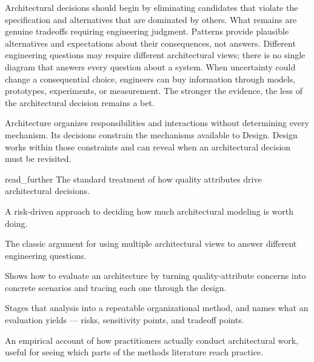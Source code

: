 Architectural decisions should begin by eliminating candidates that violate the specification and
alternatives that are dominated by others. What remains are genuine tradeoffs requiring
engineering judgment. Patterns provide plausible alternatives and expectations about their
consequences, not answers. Different engineering questions may require different architectural
views; there is no single diagram that answers every question about a system. When uncertainty
could change a consequential choice, engineers can buy information through models, prototypes,
experiments, or measurement. The stronger the evidence, the less of the architectural decision
remains a bet.

Architecture organizes responsibilities and interactions without determining every mechanism.
Its decisions constrain the mechanisms available to Design.
Design works within those constraints and can reveal when an architectural decision must be revisited.

\begin{bookbox}{read_further}{} %
\citep{bass-saip} The standard treatment of how quality attributes drive architectural decisions.

\citep{fairbanks2010} A risk-driven approach to deciding how much architectural modeling is worth doing.

\citep{kruchten1995} The classic argument for using multiple architectural views to answer different engineering questions.

\citep{abowd1996scenario} Shows how to evaluate an architecture by turning quality-attribute concerns into concrete scenarios and tracing each one through the design.

\citep{kazman2000atam} Stages that analysis into a repeatable organizational method, and names what an evaluation yields --- risks, sensitivity points, and tradeoff points.

\citep{wan2023archpractice} An empirical account of how practitioners actually conduct architectural work, useful for seeing which parts of the methods literature reach practice.
\end{bookbox}
